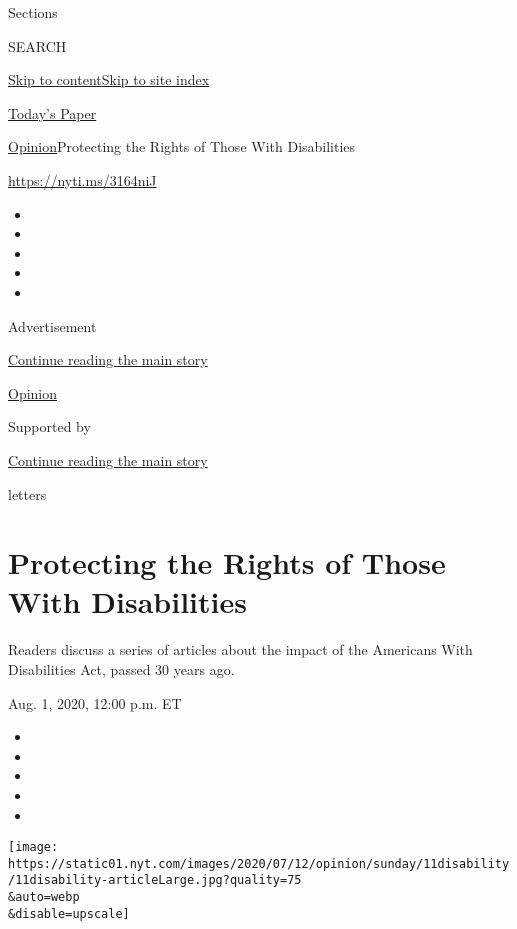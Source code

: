 Sections

SEARCH

\protect\hyperlink{site-content}{Skip to
content}\protect\hyperlink{site-index}{Skip to site index}

\href{https://myaccount.nytimes.com/auth/login?response_type=cookie\&client_id=vi}{}

\href{https://www.nytimes.com/section/todayspaper}{Today's Paper}

\href{/section/opinion}{Opinion}\textbar{}Protecting the Rights of Those
With Disabilities

\url{https://nyti.ms/3164niJ}

\begin{itemize}
\item
\item
\item
\item
\item
\end{itemize}

Advertisement

\protect\hyperlink{after-top}{Continue reading the main story}

\href{/section/opinion}{Opinion}

Supported by

\protect\hyperlink{after-sponsor}{Continue reading the main story}

letters

\hypertarget{protecting-the-rights-of-those-with-disabilities}{%
\section{Protecting the Rights of Those With
Disabilities}\label{protecting-the-rights-of-those-with-disabilities}}

Readers discuss a series of articles about the impact of the Americans
With Disabilities Act, passed 30 years ago.

Aug. 1, 2020, 12:00 p.m. ET

\begin{itemize}
\item
\item
\item
\item
\item
\end{itemize}

\texttt{[image: https://static01.nyt.com/images/2020/07/12/opinion/sunday/11disability/11disability-articleLarge.jpg?quality=75\\\&auto=webp\\\&disable=upscale]}

